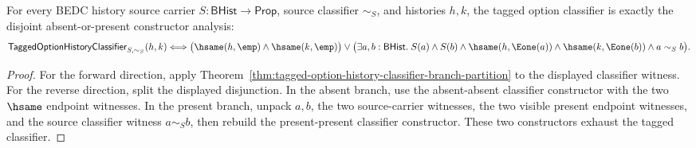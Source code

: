 \begin{theorem}
\label{thm:tagged-option-history-classifier-branch-exactness}
For every BEDC history source carrier $S:\mathsf{BHist}\to\mathsf{Prop}$,
source classifier $\sim_S$, and histories $h,k$, the tagged option classifier
is exactly the disjoint absent-or-present constructor analysis:
$$
\mathsf{TaggedOptionHistoryClassifier}_{S,\sim_S}(h,k)
\Longleftrightarrow
\bigl(\hsame(h,\emp)\land\hsame(k,\emp)\bigr)
\lor
\bigl(\exists a,b:\mathsf{BHist}.\;
S(a)\land S(b)\land
\hsame(h,\Eone(a))\land \hsame(k,\Eone(b))\land a\sim_S b\bigr).
$$
\end{theorem}
\begin{proof}
For the forward direction, apply
Theorem~\ref{thm:tagged-option-history-classifier-branch-partition} to the
displayed classifier witness. For the reverse direction, split the displayed
disjunction. In the absent branch, use the absent-absent classifier constructor
with the two $\hsame$ endpoint witnesses. In the present branch, unpack
$a,b$, the two source-carrier witnesses, the two visible present endpoint
witnesses, and the source classifier witness $a\sim_S b$, then rebuild the
present-present classifier constructor. These two constructors exhaust the
tagged classifier.
\end{proof}

